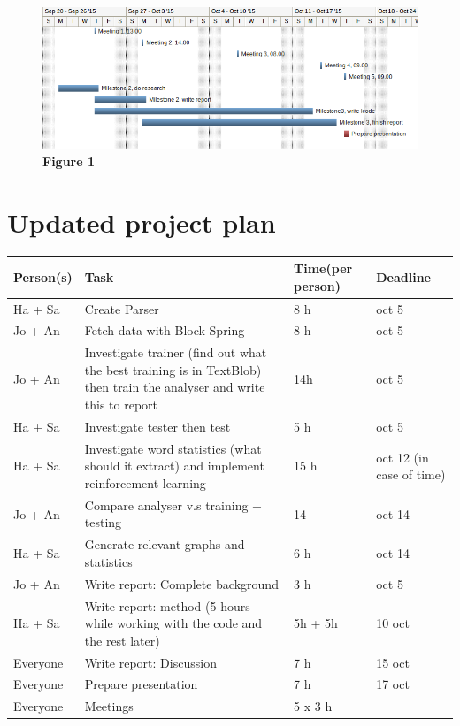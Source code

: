 \documentclass[a4paper]{article}
\begin{document}
\begin{figure}[t]

\hspace*{-1.5in}
\includegraphics[scale=0.7]{gannt.png}
\textbf{Figure 1}
\end{figure}




\newpage
\section*{Updated project plan}
\begin{center}
    \begin{tabular}{| m{2cm} | m{8cm} | p{2cm} | p{2cm} |}
    \hline
    Person(s) & Task & Time(per person) & Deadline\\ \hline
    Ha + Sa & Create Parser & 8 h & oct 5\\ \hline
    Jo + An & Fetch data with Block Spring & 8 h & oct 5 \\ \hline
    Jo + An  & Investigate trainer (find out what the best training is in TextBlob) then train the analyser and write this to report & 14h & oct 5\\ \hline
    Ha + Sa & Investigate tester then test  & 5 h & oct 5\\ \hline
    Ha + Sa & Investigate word statistics (what should it extract) and implement reinforcement learning & 15 h & oct 12 (in case of time)\\ \hline
    Jo + An & Compare analyser v.s training + testing & 14 & oct 14\\ \hline
    Ha + Sa & Generate relevant graphs and statistics & 6 h & oct 14\\ \hline
    Jo + An & Write report: Complete background & 3 h & oct 5\\ \hline
    Ha + Sa & Write report: method (5 hours while working with the code and the rest later) & 5h + 5h &  10 oct\\ \hline
    Everyone & Write report: Discussion & 7 h & 15 oct\\ \hline
    Everyone & Prepare presentation & 7 h & 17 oct\\ \hline
    Everyone & Meetings & 5 x 3 h & 
    \end{tabular}
\end{center}
\end{document}
